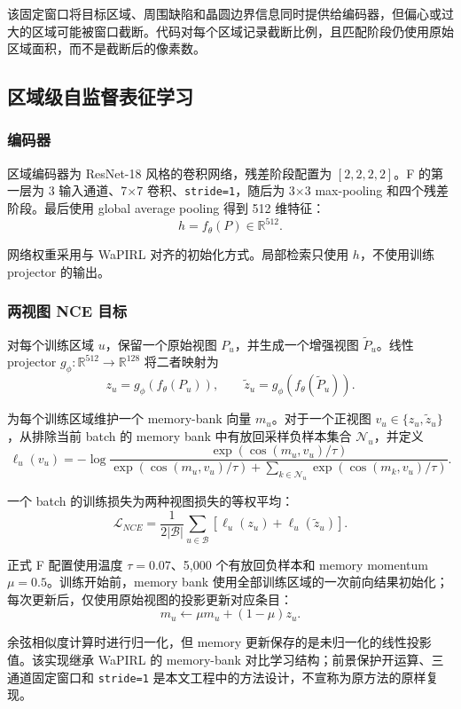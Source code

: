 \documentclass[UTF8,a4paper,11pt,fontset=fandol]{ctexart}
\begin{document}
该固定窗口将目标区域、周围缺陷和晶圆边界信息同时提供给编码器，但偏心或过大的区域可能被窗口截断。代码对每个区域记录截断比例，且匹配阶段仍使用原始区域面积，而不是截断后的像素数。

\subsection{区域级自监督表征学习}

\subsubsection{编码器}

区域编码器为 ResNet-18 风格的卷积网络，残差阶段配置为 \([2,2,2,2]\)。F 的第一层为 3 输入通道、7\(\times\)7 卷积、\texttt{stride=1}，随后为 3\(\times\)3 max-pooling 和四个残差阶段。最后使用 global average pooling 得到 512 维特征：
\[
h=f_\theta(P)\in\mathbb{R}^{512}.
\]

网络权重采用与 WaPIRL 对齐的初始化方式。局部检索只使用 \(h\)，不使用训练 projector 的输出。

\subsubsection{两视图 NCE 目标}

对每个训练区域 \(u\)，保留一个原始视图 \(P_u\)，并生成一个增强视图 \(\widetilde P_u\)。线性 projector
\(g_\phi:\mathbb{R}^{512}\rightarrow\mathbb{R}^{128}\)
将二者映射为
\[
z_u=g_\phi(f_\theta(P_u)),\qquad
\widetilde z_u=g_\phi(f_\theta(\widetilde P_u)).
\]

为每个训练区域维护一个 memory-bank 向量 \(m_u\)。对于一个正视图 \(v_u\in\{z_u,\widetilde z_u\}\)，从排除当前 batch 的 memory bank 中有放回采样负样本集合 \(\mathcal{N}_u\)，并定义
\[
\ell_u(v_u)=-\log
\frac{\exp(\operatorname{cos}(m_u,v_u)/\tau)}
{\exp(\operatorname{cos}(m_u,v_u)/\tau)+
\sum_{k\in\mathcal{N}_u}\exp(\operatorname{cos}(m_k,v_u)/\tau)}.
\]

一个 batch 的训练损失为两种视图损失的等权平均：
\[
\mathcal{L}_{NCE}=\frac{1}{2|\mathcal{B}|}
\sum_{u\in\mathcal{B}}
\left[\ell_u(z_u)+\ell_u(\widetilde z_u)\right].
\]

正式 F 配置使用温度 \(\tau=0.07\)、5,000 个有放回负样本和 memory momentum \(\mu=0.5\)。训练开始前，memory bank 使用全部训练区域的一次前向结果初始化；每次更新后，仅使用原始视图的投影更新对应条目：
\[
m_u\leftarrow \mu m_u+(1-\mu)z_u.
\]

余弦相似度计算时进行归一化，但 memory 更新保存的是未归一化的线性投影值。该实现继承 WaPIRL 的 memory-bank 对比学习结构；前景保护开运算、三通道固定窗口和 \texttt{stride=1} 是本文工程中的方法设计，不宣称为原方法的原样复现。
\end{document}
